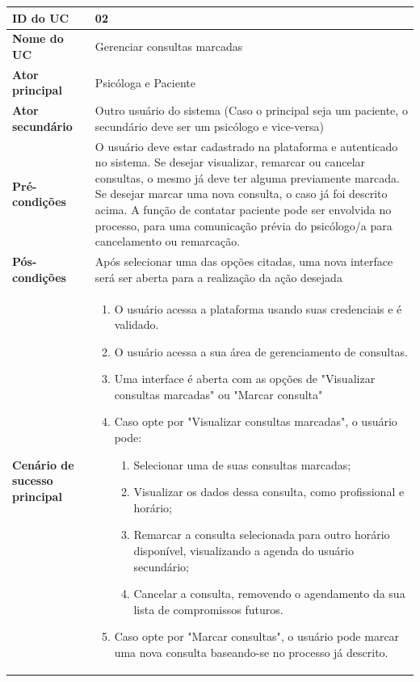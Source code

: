 \documentclass[a4paper,12pt]{report}
\begin{document}
\begin{longtable}{|p{4cm}|p{11.5cm}|}
    \hline
    \textbf{ID do UC} & \textbf{02} \\ \hline
    \textbf{Nome do UC} & Gerenciar consultas marcadas \\ \hline
    \textbf{Ator principal} &Psicóloga e Paciente \\ \hline
    \textbf{Ator secundário} & Outro usuário do sistema (Caso o principal seja um paciente, o secundário deve ser um psicólogo e vice-versa) \\ \hline
    \textbf{Pré-condições} & O usuário deve estar cadastrado na plataforma e autenticado no sistema. Se desejar visualizar, remarcar ou cancelar consultas, o mesmo já deve ter alguma previamente marcada. Se desejar marcar uma nova consulta, o caso já foi descrito acima.
    A função de contatar paciente pode ser envolvida no processo, para uma comunicação prévia do psicólogo/a para cancelamento ou remarcação. \\ \hline
    \textbf{Pós-condições} & Após selecionar uma das opções citadas, uma nova interface será ser aberta para a realização da ação desejada \\ \hline
    \textbf{Cenário de sucesso principal} & 
    \begin{enumerate}[leftmargin=*,labelsep=1em]
        \item O usuário acessa a plataforma usando suas credenciais e é validado.
        \item O usuário acessa a sua área de gerenciamento de consultas.
        \item Uma interface é aberta com as opções de "Visualizar consultas marcadas" ou "Marcar consulta"
        \item Caso opte por "Visualizar consultas marcadas", o usuário pode:
            \begin{enumerate}[leftmargin=*,labelsep=1em]
                \item Selecionar uma de suas consultas marcadas;
                \item Visualizar os dados dessa consulta, como profissional e horário;
                \item Remarcar a consulta selecionada para outro horário disponível, visualizando a agenda do usuário secundário;
                \item Cancelar a consulta, removendo o agendamento da sua lista de compromissos futuros.
            \end{enumerate}
        \item Caso opte por "Marcar consultas", o usuário pode marcar uma nova consulta baseando-se no processo já descrito.

\end{enumerate}
\end{longtable}
\end{document}
